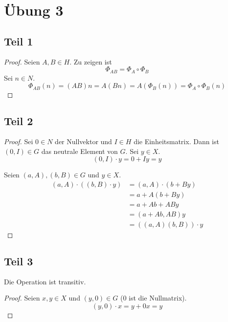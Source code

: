 \documentclass[10pt,a4paper]{article}
\begin{document}
\section{Übung 3}

\subsection{Teil 1}

\begin{proof}
  Seien $A, B \in H$.
  Zu zeigen ist
  \begin{equation}
    \Phi_{AB} = \Phi_{A} \circ \Phi_{B}
  \end{equation}
  Sei $n \in N$.
  \begin{equation}
    \Phi_{AB}(n) = (AB)n = A(Bn) = A(\Phi_{B}(n)) = \Phi_{A} \circ \Phi_{B}(n)
  \end{equation}
\end{proof}

\subsection{Teil 2}

\begin{proof}
  Sei $0 \in N$ der Nullvektor und $I \in H$ die Einheitsmatrix.
  Dann ist $(0, I) \in G$ das neutrale Element von $G$.
  Sei $y \in X$.
  \begin{equation}
    (0, I) \cdot y = 0 + Iy = y
  \end{equation}

  Seien $(a, A), (b, B) \in G$ und $y \in X$.
  \begin{align*}
    (a, A) \cdot ((b, B) \cdot y) & = (a, A) \cdot (b + By)\\
    & = a + A(b + By)\\
    & = a + Ab + ABy\\
    & = (a + Ab, AB)y\\
    & = ((a, A)(b, B)) \cdot y
  \end{align*}
\end{proof}

\subsection{Teil 3}

Die Operation ist transitiv.
\begin{proof}
  Seien $x, y \in X$ und $(y, 0) \in G$ ($0$ ist die Nullmatrix).
  \begin{equation}
    (y, 0) \cdot x = y + 0x = y
  \end{equation}
\end{proof}
\end{document}
